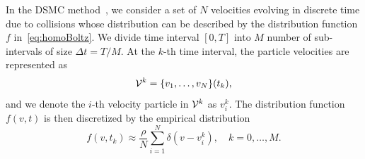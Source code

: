 \documentclass[12pt,nopreprintline]{elsarticle}
\begin{document}
In the DSMC method~\cite{bird1970direct,nanbu1980direct,babovsky1989convergence}, we consider a set of $N$ velocities evolving in discrete time due to collisions whose distribution can be described by the distribution function $f$ in~\eqref{eq:homoBoltz}. We divide time interval $[0,T]$ into $M$ number of sub-intervals of size $\Delta t=T/M$. At the $k$-th time interval, the particle velocities are represented as
\begin{equation*}%
{\cal V}^k =\{v_1, \ldots , v_N\} (t_k),
\end{equation*}
and we denote the $i$-th velocity particle in ${\cal V}^k $ as $v_i^k$. The distribution function $f(v,t)$ is then discretized by the empirical distribution
\begin{equation}\label{eq:empirical}
    f(v,t_k) \approx \frac{\rho}{N} \sum_{i=1}^N \delta(v-v_i^k), \quad k = 0,\ldots,M.
\end{equation}
\end{document}

